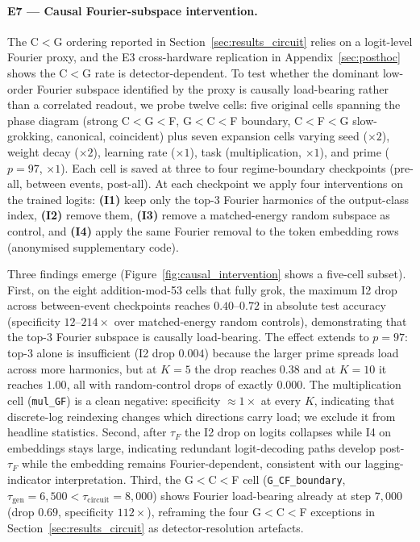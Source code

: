 \documentclass{article}
\newcommand{\taug}{\tau_{\mathrm{gen}}}
\newcommand{\tauf}{\tau_{F}}
\newcommand{\taucirc}{\tau_{\mathrm{circuit}}}
\begin{document}
\paragraph{E7 --- Causal Fourier-subspace intervention.}
The C$<$G ordering reported in
Section~\ref{sec:results_circuit} relies on a logit-level Fourier
proxy, and the E3 cross-hardware replication in
Appendix~\ref{sec:posthoc} shows the C$<$G rate is
detector-dependent.
To test whether the dominant low-order Fourier subspace
identified by the proxy is causally load-bearing rather than a
correlated readout, we probe twelve cells: five original cells
spanning the phase diagram (strong C$<$G$<$F, G$<$C$<$F boundary,
C$<$F$<$G slow-grokking, canonical, coincident) plus seven
expansion cells varying seed ($\times 2$), weight decay
($\times 2$), learning rate ($\times 1$), task (multiplication,
$\times 1$), and prime ($p{=}97$, $\times 1$).
Each cell is saved at three to four regime-boundary checkpoints
(pre-all, between events, post-all).
At each checkpoint we apply four interventions on the trained
logits: \textbf{(I1)} keep only the top-$3$ Fourier harmonics of
the output-class index, \textbf{(I2)} remove them, \textbf{(I3)}
remove a matched-energy random subspace as control, and
\textbf{(I4)} apply the same Fourier removal to the token
embedding rows (anonymised supplementary code).

Three findings emerge (Figure~\ref{fig:causal_intervention}
shows a five-cell subset).
First, on the eight addition-mod-53 cells that fully grok,
the maximum I2 drop across between-event checkpoints reaches
$0.40$--$0.72$ in absolute test accuracy (specificity
$12$--$214\times$ over matched-energy random controls),
demonstrating that the top-$3$ Fourier subspace is causally
load-bearing.
The effect extends to $p{=}97$: top-3 alone is insufficient
(I2 drop $0.004$) because the larger prime spreads load across
more harmonics, but at $K{=}5$ the drop reaches $0.38$ and at
$K{=}10$ it reaches $1.00$, all with random-control drops of
exactly $0.000$.
The multiplication cell (\texttt{mul\_GF}) is a clean negative:
specificity ${\approx}1\times$ at every $K$, indicating that
discrete-log reindexing changes which directions carry load; we
exclude it from headline statistics.
Second, after $\tauf$ the I2 drop on logits collapses while I4
on embeddings stays large, indicating redundant logit-decoding
paths develop post-$\tauf$ while the embedding remains
Fourier-dependent, consistent with our lagging-indicator
interpretation.
Third, the G$<$C$<$F cell (\texttt{G\_CF\_boundary},
$\taug{=}6{,}500<\taucirc{=}8{,}000$) shows Fourier load-bearing
already at step $7{,}000$ (drop $0.69$, specificity $112\times$),
reframing the four G$<$C$<$F exceptions in
Section~\ref{sec:results_circuit} as detector-resolution artefacts.
\end{document}
